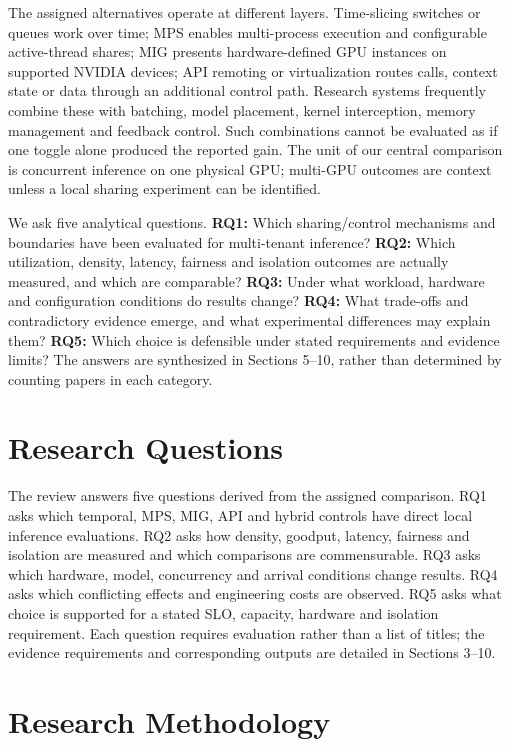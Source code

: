 \documentclass[12pt,a4paper]{article}
\begin{document}
The assigned alternatives operate at different layers. Time-slicing switches or queues work over time; MPS enables multi-process execution and configurable active-thread shares; MIG presents hardware-defined GPU instances on supported NVIDIA devices; API remoting or virtualization routes calls, context state or data through an additional control path. Research systems frequently combine these with batching, model placement, kernel interception, memory management and feedback control. Such combinations cannot be evaluated as if one toggle alone produced the reported gain. The unit of our central comparison is concurrent inference on one physical GPU; multi-GPU outcomes are context unless a local sharing experiment can be identified.

We ask five analytical questions. \textbf{RQ1:} Which sharing/control mechanisms and boundaries have been evaluated for multi-tenant inference? \textbf{RQ2:} Which utilization, density, latency, fairness and isolation outcomes are actually measured, and which are comparable? \textbf{RQ3:} Under what workload, hardware and configuration conditions do results change? \textbf{RQ4:} What trade-offs and contradictory evidence emerge, and what experimental differences may explain them? \textbf{RQ5:} Which choice is defensible under stated requirements and evidence limits? The answers are synthesized in Sections 5--10, rather than determined by counting papers in each category.

\section{Research Questions}
The review answers five questions derived from the assigned comparison. RQ1 asks which temporal, MPS, MIG, API and hybrid controls have direct local inference evaluations. RQ2 asks how density, goodput, latency, fairness and isolation are measured and which comparisons are commensurable. RQ3 asks which hardware, model, concurrency and arrival conditions change results. RQ4 asks which conflicting effects and engineering costs are observed. RQ5 asks what choice is supported for a stated SLO, capacity, hardware and isolation requirement. Each question requires evaluation rather than a list of titles; the evidence requirements and corresponding outputs are detailed in Sections 3--10.
\section{Research Methodology}
\end{document}
